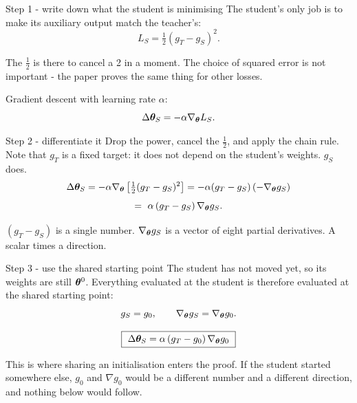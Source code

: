 \documentclass[aspectratio=169]{beamer}
\begin{document}
\begin{frame}{Step 1 - write down what the student is minimising}
  The student's only job is to make its auxiliary output match the teacher's:
  \[
    L_S = \tfrac{1}{2}\left(g_T - g_S\right)^2 .
  \]

  \medskip
  The $\tfrac{1}{2}$ is there to cancel a 2 in a moment. The choice of squared error is
  not important - the paper proves the same thing for other losses.

  \medskip
  Gradient descent with learning rate $\alpha$:
  \[
    \Delta\bm{\theta}_S = -\alpha \nabla_{\bm{\theta}} L_S .
  \]
\end{frame}

\begin{frame}{Step 2 - differentiate it}
  Drop the power, cancel the $\tfrac12$, and apply the chain rule. Note that $g_T$ is a
  fixed target: it does not depend on the student's weights. $g_S$ does.
  \[
    \Delta\bm{\theta}_S
      = -\alpha \nabla_{\bm{\theta}} \left[\tfrac12 (g_T - g_S)^2\right]
      = -\alpha (g_T - g_S)\left(-\nabla_{\bm{\theta}} g_S\right)
  \]
  \[
    = \ \alpha\,(g_T - g_S)\,\nabla_{\bm{\theta}} g_S .
  \]

  \medskip
  \begin{tcolorbox}[colback=armblue!8, colframe=armblue, boxrule=0.6pt, arc=2pt]
    $(g_T - g_S)$ is a single number. $\nabla_{\bm{\theta}} g_S$ is a vector of eight partial
    derivatives. A scalar times a direction.
  \end{tcolorbox}
\end{frame}

\begin{frame}{Step 3 - use the shared starting point}
  The student has not moved yet, so its weights are still $\bm{\theta}^0$. Everything
  evaluated at the student is therefore evaluated at the shared starting point:
  \[
    g_S = g_0, \qquad \nabla_{\bm{\theta}} g_S = \nabla_{\bm{\theta}} g_0 .
  \]

  \medskip
  \[
    \boxed{\ \Delta\bm{\theta}_S = \alpha\,(g_T - g_0)\,\nabla_{\bm{\theta}} g_0\ }
  \]

  \bigskip
  \begin{tcolorbox}[colback=armorange!12, colframe=armorange, boxrule=0.6pt, arc=2pt]
    This is where sharing an initialisation enters the proof. If the student started
    somewhere else, $g_0$ and $\nabla g_0$ would be a different number and a different
    direction, and nothing below would follow.
  \end{tcolorbox}
\end{frame}
\end{document}
